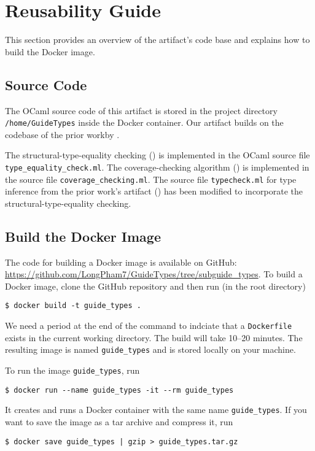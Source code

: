 
\section{Reusability Guide}

This section provides an overview of the artifact's code base and explains how
to build the Docker image.

\subsection{Source Code}
\label{sec:Source Code}

The OCaml source code of this artifact is stored in the project directory
\texttt{/home/GuideTypes} inside the Docker container.
%
Our artifact builds on the codebase of the prior work\footnotemark by
\citeauthor{PLDI:WHR21B}.

The structural-type-equality checking () is implemented in the OCaml source file
\texttt{type\_equality\_check.ml}.
%
The coverage-checking algorithm ()
is implemented in the source file \texttt{coverage\_checking.ml}.
%
The source file \texttt{typecheck.ml} for type inference from the prior work's
artifact () has been modified to
incorporate the structural-type-equality checking.


\subsection{Build the Docker Image}
\label{sec:Build the Docker Image}

The code for building a Docker image is available on GitHub:
\url{https://github.com/LongPham7/GuideTypes/tree/subguide_types}.
%
To build a Docker image, clone the GitHub repository and then run (in the root
directory)
\begin{verbatim}
$ docker build -t guide_types .
\end{verbatim}
%
We need a period at the end of the command to indciate that a
\texttt{Dockerfile} exists in the current working directory.
%
The build will take 10--20 minutes.
%
The resulting image is named \texttt{guide\_types} and is stored locally on your
machine.

To run the image \texttt{guide\_types}, run
\begin{verbatim}
$ docker run --name guide_types -it --rm guide_types
\end{verbatim}
%
It creates and runs a Docker container with the same name \texttt{guide\_types}.
%
If you want to save the image as a tar archive and compress it, run
\begin{verbatim}
$ docker save guide_types | gzip > guide_types.tar.gz
\end{verbatim}

